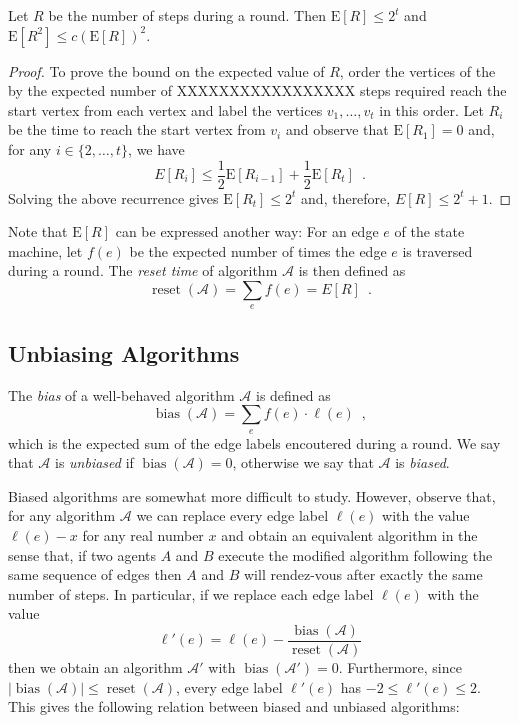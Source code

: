 \documentclass[lotsofwhite]{patmorin}
\newcommand{\E}{\mathrm{E}}
\newcommand{\A}{\mathcal{A}}
\DeclareMathOperator{\bias}{bias}
\DeclareMathOperator{\reset}{reset}
\begin{document}
\begin{lem}
Let $R$ be the number of steps during a round. Then 
$\E[R] \le 2^t$ and $\E[R^2] \le c(\E[R])^2$.
\end{lem}

\begin{proof}
To prove the bound on the expected value of $R$, order the vertices of
the by the expected number of XXXXXXXXXXXXXXXXX steps required reach the start vertex
from each vertex and label the vertices $v_1,\ldots,v_t$ in this
order.  Let $R_i$ be the time to reach the start vertex from $v_i$ and
observe that $\E[R_1]=0$ and, for any $i\in\{2,\ldots,t\}$, we have 
\[
   E[R_i] \le \frac{1}{2}\E[R_{i-1}] + \frac{1}{2}\E[R_t] \enspace .
\]
Solving the above recurrence gives $\E[R_t] \le 2^t$ and, therefore,
$E[R] \le 2^t + 1$.
\end{proof}

Note that $\E[R]$ can be expressed another way: For an edge $e$ of the
state machine, let $f(e)$ be the expected number of times the edge $e$
is traversed during a round.  The
\emph{reset time} of algorithm $\A$ is then defined as
\[
   \reset(\A) = \sum_e f(e) = E[R] \enspace .
\]

\subsection{Unbiasing Algorithms}

The \emph{bias} of a well-behaved algorithm $\A$ is defined as
\[
    \bias(\A) = \sum_{e} f(e)\cdot\ell(e) \enspace ,
\]
which is the expected sum of the edge labels encoutered during a round.
We say that $\A$ is \emph{unbiased} if $\bias(\A)=0$, otherwise we say
that $\A$ is \emph{biased}.

Biased algorithms are somewhat more difficult to study.  However,
observe that, for any algorithm $\mathcal{A}$ we can replace every
edge label $\ell(e)$ with the value $\ell(e)-x$ for any real number
$x$ and obtain an equivalent algorithm in the sense that, if two
agents $A$ and $B$ execute the modified algorithm following the same
sequence of edges then $A$ and $B$ will rendez-vous after exactly the
same number of steps.  In particular, if we replace each edge label
$\ell(e)$ with the value
\[
   \ell'(e) = \ell(e) - \frac{\bias(\A)}{\reset(\A)}
\]
then we obtain an algorithm $\A'$ with $\bias(\A')=0$.  Furthermore, since
$|\bias(\A)|\le\reset(\A)$, every edge label $\ell'(e)$ has
$-2 \le \ell'(e)\le 2$.  This gives the following relation between
biased and unbiased algorithms:
\end{document}
